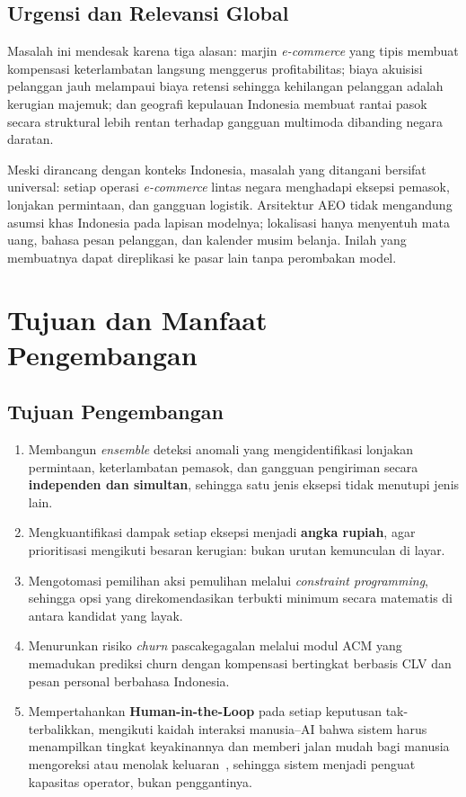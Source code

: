 \documentclass[12pt,a4paper]{article}
\begin{document}
\subsection{Urgensi dan Relevansi Global}

Masalah ini mendesak karena tiga alasan: marjin \textit{e-commerce} yang tipis membuat kompensasi keterlambatan langsung menggerus profitabilitas; biaya akuisisi pelanggan jauh melampaui biaya retensi sehingga kehilangan pelanggan adalah kerugian majemuk; dan geografi kepulauan Indonesia membuat rantai pasok secara struktural lebih rentan terhadap gangguan multimoda dibanding negara daratan.

Meski dirancang dengan konteks Indonesia, masalah yang ditangani bersifat universal: setiap operasi \textit{e-commerce} lintas negara menghadapi eksepsi pemasok, lonjakan permintaan, dan gangguan logistik. Arsitektur AEO tidak mengandung asumsi khas Indonesia pada lapisan modelnya; lokalisasi hanya menyentuh mata uang, bahasa pesan pelanggan, dan kalender musim belanja. Inilah yang membuatnya dapat direplikasi ke pasar lain tanpa perombakan model.

\section{Tujuan dan Manfaat Pengembangan}

\subsection{Tujuan Pengembangan}

\begin{enumerate}
  \item Membangun \textit{ensemble} deteksi anomali yang mengidentifikasi lonjakan permintaan, keterlambatan pemasok, dan gangguan pengiriman secara \textbf{independen dan simultan}, sehingga satu jenis eksepsi tidak menutupi jenis lain.

  \item Mengkuantifikasi dampak setiap eksepsi menjadi \textbf{angka rupiah}, agar prioritisasi mengikuti besaran kerugian: bukan urutan kemunculan di layar.

  \item Mengotomasi pemilihan aksi pemulihan melalui \textit{constraint programming}, sehingga opsi yang direkomendasikan terbukti minimum secara matematis di antara kandidat yang layak.

  \item Menurunkan risiko \textit{churn} pascakegagalan melalui modul ACM yang memadukan prediksi churn dengan kompensasi bertingkat berbasis CLV dan pesan personal berbahasa Indonesia.

  \item Mempertahankan \textbf{Human-in-the-Loop} pada setiap keputusan tak-terbalikkan, mengikuti kaidah interaksi manusia--AI bahwa sistem harus menampilkan tingkat keyakinannya dan memberi jalan mudah bagi manusia mengoreksi atau menolak keluaran~\cite{amershi}, sehingga sistem menjadi penguat kapasitas operator, bukan penggantinya.
\end{enumerate}
\end{document}
